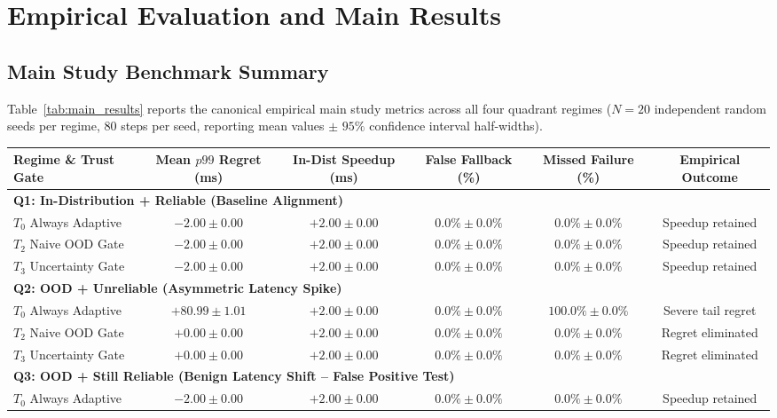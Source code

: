 \section{Empirical Evaluation and Main Results}
\label{sec:results}

\subsection{Main Study Benchmark Summary}
Table~\ref{tab:main_results} reports the canonical empirical main study metrics across all four quadrant regimes ($N=20$ independent random seeds per regime, $80$ steps per seed, reporting mean values $\pm$ $95\%$ confidence interval half-widths).

\begin{table}[t]
\centering
\small
\begin{tabular}{|l|c|c|c|c|c|}
\hline
\textbf{Regime \& Trust Gate} & \textbf{Mean $p99$ Regret (ms)} & \textbf{In-Dist Speedup (ms)} & \textbf{False Fallback (\%)} & \textbf{Missed Failure (\%)} & \textbf{Empirical Outcome} \\ \hline
\multicolumn{6}{|l|}{\textbf{Q1: In-Distribution + Reliable (Baseline Alignment)}} \\ \hline
$T_0$ Always Adaptive & $-2.00 \pm 0.00$ & $+2.00 \pm 0.00$ & $0.0\% \pm 0.0\%$ & $0.0\% \pm 0.0\%$ & Speedup retained \\ \hline
$T_2$ Naive OOD Gate & $-2.00 \pm 0.00$ & $+2.00 \pm 0.00$ & $0.0\% \pm 0.0\%$ & $0.0\% \pm 0.0\%$ & Speedup retained \\ \hline
$T_3$ Uncertainty Gate & $-2.00 \pm 0.00$ & $+2.00 \pm 0.00$ & $0.0\% \pm 0.0\%$ & $0.0\% \pm 0.0\%$ & Speedup retained \\ \hline
\multicolumn{6}{|l|}{\textbf{Q2: OOD + Unreliable (Asymmetric Latency Spike)}} \\ \hline
$T_0$ Always Adaptive & $+80.99 \pm 1.01$ & $+2.00 \pm 0.00$ & $0.0\% \pm 0.0\%$ & $100.0\% \pm 0.0\%$ & Severe tail regret \\ \hline
$T_2$ Naive OOD Gate & $+0.00 \pm 0.00$ & $+2.00 \pm 0.00$ & $0.0\% \pm 0.0\%$ & $0.0\% \pm 0.0\%$ & Regret eliminated \\ \hline
$T_3$ Uncertainty Gate & $+0.00 \pm 0.00$ & $+2.00 \pm 0.00$ & $0.0\% \pm 0.0\%$ & $0.0\% \pm 0.0\%$ & Regret eliminated \\ \hline
\multicolumn{6}{|l|}{\textbf{Q3: OOD + Still Reliable (Benign Latency Shift -- False Positive Test)}} \\ \hline
$T_0$ Always Adaptive & $-2.00 \pm 0.00$ & $+2.00 \pm 0.00$ & $0.0\% \pm 0.0\%$ & $0.0\% \pm 0.0\%$ & Speedup retained \\ \hline

\end{tabular}
\end{table}
